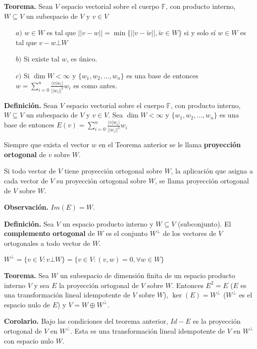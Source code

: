 \newpage

\textbf{Teorema.} Sean $V$ espacio vectorial sobre
el cuerpo $\mathbb{F}$, con producto interno, $W \subseteq V$ un subespacio de
$V$ y $v\in V$

\begin{itemize}
    \item[$a)$] $w \in W$  es tal que $||v-w||=  \min \{ ||v- \tilde{w}||,
    \tilde{w} \in W \}$ si y solo sí $w\in W$ es tal que $v - w \bot W$
    \item[$b)$] Si existe tal $w$, es único.
    \item[$c)$] Si $\dim W < \infty$ y $\{w_{1}, w_{2}, \dots, w_{n}\}$ es una
    base de entonces $w=\displaystyle{\sum_{i=0}^{n}} \frac{\langle v|w_{i} \rangle}
    {||w_{i}||^2}w_{i}$ es como antes.
\end{itemize}

\textbf{Definición.} Sean $V$ espacio vectorial sobre
el cuerpo $\mathbb{F}$, con producto interno, $W \subseteq V$ un subespacio de
$V$ y $v\in V$. Sea $\dim W < \infty$ y $\{w_{1}, w_{2}, \dots, w_{n}\}$ es una
base de entonces
$E(v)=\displaystyle{\sum_{i=0}^{n}} \frac{\langle v|w_{i} \rangle}{||w_{i}||^2}w_{i}$ 

Siempre que exista el vector $w$ en el Teorema anterior se le llama \textbf{proyección
ortogonal} de $v$ sobre $W$.

Si todo vector de $V$ tiene proyección ortogonal sobre $W$,
la aplicación que asigna a cada vector de $V$ su proyección ortogonal sobre $W$, se
llama proyección ortogonal de $V$ sobre $W$.

\textbf{Observación.} $Im(E)=W$.

\textbf{Definición.} Sea $V$ un espacio producto interno y $W\subseteq V$ (subconjunto).
El \textbf{complemento ortogonal} de $W$ es el conjunto $W^{\bot}$
de los vectores de $V$ ortogonales a todo vector de $W$.

$W^{\bot}=\{v \in V: v\bot W\}=\{v \in V: (v,w)=0, \forall w \in W\}$

\textbf{Teorema.} Sea $W$ un subespacio de dimensión finita de un espacio
producto interno $V$ y sea $E$ la proyección ortogonal de $V$ sobre $W$.
Entonces $E^{2}=E$ ($E$ es una transformación lineal idempotente de $V$
sobre $W$), $\ker(E)=W^{\bot}$ ($W^{\bot}$ es el espacio nulo de $E$) y
$V = W \oplus W^{\bot}$.

\textbf{Corolario.} Bajo las condiciones del teorema anterior, $Id - E$
es la proyección ortogonal de $V$ en $W^{\bot}$. Esta es una transformación
lineal idempotente de $V$ en $W^{\bot}$ con espacio nulo $W$.